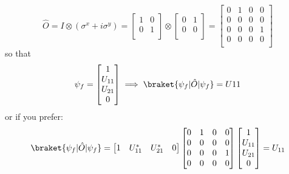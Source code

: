 \begin{equation}
    \hat{O}=I \otimes (\sigma^{x} + i\sigma^{y}) =
    \begin{bmatrix}
        1 & 0\\
        0 & 1\\
    \end{bmatrix}
    \otimes
    \begin{bmatrix}
        0 & 1\\
        0 & 0\\
    \end{bmatrix}=
    \begin{bmatrix}
        0 & 1 & 0 & 0\\
        0 & 0 & 0 & 0\\
        0 & 0 & 0 & 1\\
        0 & 0 & 0 & 0\\
    \end{bmatrix}
\end{equation}
so that
\begin{equation}
    \psi_{f}=
    \begin{bmatrix}
        1 \\
        U_{11} \\
        U_{21} \\
        0 \\
    \end{bmatrix}
    \implies
    \braket{\psi_{f}|\hat{O}|\psi_{f}} = U11
\end{equation}
or if you prefer:
\begin{equation}
    \braket{\psi_{f}|\hat{O}|\psi_{f}} =
    \begin{bmatrix}
        1 & U_{11}^{*} & U_{21}^{*} & 0
    \end{bmatrix}
    \begin{bmatrix}
        0 & 1 & 0 & 0\\
        0 & 0 & 0 & 0\\
        0 & 0 & 0 & 1\\
        0 & 0 & 0 & 0\\
    \end{bmatrix}
    \begin{bmatrix}
        1 \\
        U_{11} \\
        U_{21} \\
        0 \\
    \end{bmatrix}
    = U_{11}
\end{equation}


